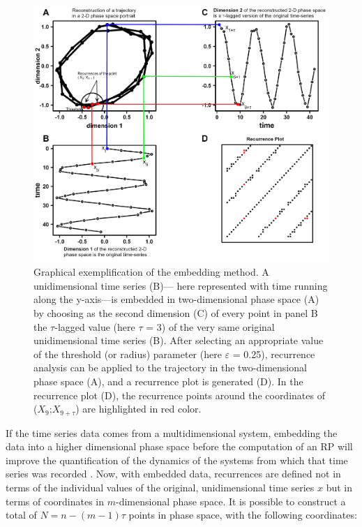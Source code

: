 \begin{figure}
\includegraphics[width=\columnwidth]{Figure2_complete.png}
\caption{\label{fig:embedding}Graphical exemplification of the embedding method. A unidimensional time series (B)--- here represented with time running along the y-axis---is embedded in two-dimensional phase space (A) by choosing as the second dimension (C) of every point in panel B the $\tau$-lagged value (here $\tau$ = 3) of the very same original unidimensional time series (B). After selecting an appropriate value of the threshold (or radius) parameter (here $\varepsilon$ = 0.25), recurrence analysis can be applied to the trajectory in the two-dimensional phase space (A), and a recurrence plot is generated (D). In the recurrence plot (D), the recurrence points around the coordinates of ($X_9$;$X_{9+\tau}$) are highlighted in red color.}
\end{figure}

If the time series data comes from a multidimensional system, embedding the data into a higher dimensional phase space before the computation of an RP will improve the quantification of the dynamics of the systems from which that time series was recorded \citep{marwan2007recurrence}. Now, with embedded data, recurrences are defined not in terms of the individual values of the original, unidimensional time series $x$ but in terms of coordinates in $m$-dimensional phase space. It is possible to construct a total of $N = n-(m-1)\tau$ points in phase space, with the following coordinates:

